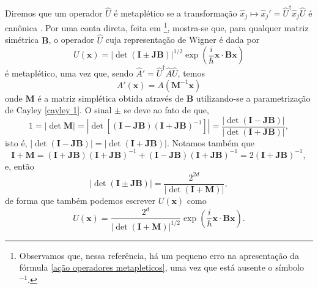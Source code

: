 \documentclass[
	12pt,
	oneside,			%
	a4paper,			%
	english,			%
	brazil				%
	]{abntex2}
\theoremstyle{definition}
\begin{document}
Diremos que um operador $\hat{U}$ é metaplético se a transformação $\hat{x}_j \mapsto \hat{x}_j' =  \hat{U}^\dagger \hat{x}_j \hat{U}$ é canônica \cite{littlejohn1986semiclassical}. Por uma conta direta, feita em \cite{DEALMEIDA1998265} \footnote{Observamos que, nessa referência, há um pequeno erro na apresentação da fórmula \eqref{ação operadores metapleticos}, uma vez que está ausente o símbolo $^{-1}$.}, mostra-se que, para qualquer matriz simétrica $\mathbf{B}$, o operador $\hat{U}$ cuja representação de Wigner é dada por
\begin{equation}
\label{representação de wigner operador metapletico}
    U(\mathbf{x}) = \left| \det \left( \mathbf{I} \pm \mathbf{JB} \right) \right|^{1/2} \exp \left( \frac{i}{\hbar} \mathbf{x} \cdot \mathbf{B} \mathbf{x} \right)
\end{equation}
é metaplético, uma vez que, sendo $\hat{A}' = \hat{U}^\dagger \hat{A} \hat{U}$, temos
\begin{equation}
\label{ação operadores metapleticos}
    A'(\mathbf{x}) = A\left(\mathbf{M}^{-1} \mathbf{x} \right)
\end{equation}
onde $\mathbf{M}$ é a matriz simplética obtida através de $\mathbf{B}$ utilizando-se a parametrização de Cayley \eqref{cayley 1}. O sinal $\pm$ se deve ao fato de que,
\begin{equation}
\label{um mais ou menos jota b}
    1 = \left|\det \mathbf{M} \right| = \left|\det \left[\left( \mathbf{I}- \mathbf{JB} \right)\left( \mathbf{I}+ \mathbf{JB} \right)^{-1} \right] \right| = \frac{\left| \det \left( \mathbf{I}- \mathbf{JB} \right) \right|}{\left| \det \left( \mathbf{I} + \mathbf{JB} \right) \right|},
\end{equation}
isto é, $\left| \det \left( \mathbf{I}- \mathbf{JB} \right) \right| = \left| \det \left( \mathbf{I}+ \mathbf{JB} \right) \right|$. Notamos também que
\begin{equation}
    \mathbf{I} + \mathbf{M} = \left( \mathbf{I}+ \mathbf{JB} \right)\left( \mathbf{I}+ \mathbf{JB} \right)^{-1} + \left( \mathbf{I}- \mathbf{JB} \right)\left( \mathbf{I}+ \mathbf{JB} \right)^{-1} = 2\left( \mathbf{I}+ \mathbf{JB} \right)^{-1},
\end{equation}
e, então
\begin{equation}
    \left| \det\left( \mathbf{I} \pm \mathbf{JB} \right) \right| = \frac{2^{2d}}{\left| \det\left( \mathbf{I} + \mathbf{M} \right) \right|},
\end{equation}
de forma que também podemos escrever $U(\mathbf{x})$ como
\begin{equation}
\label{representação de wigner operador metapletico v2}
    U(\mathbf{x}) = \frac{2^{d}}{\left| \det\left( \mathbf{I} + \mathbf{M} \right) \right|^{1/2}} \exp \left( \frac{i}{\hbar} \mathbf{x} \cdot \mathbf{B} \mathbf{x} \right).
\end{equation}
\end{document}
